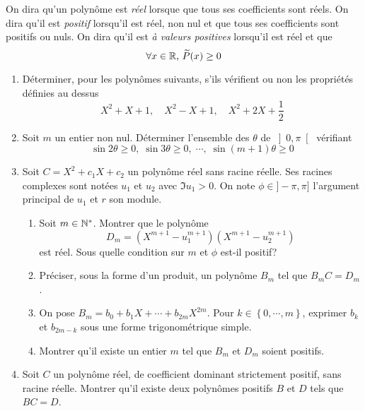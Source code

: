 On dira qu'un polyn{\^o}me est \emph{réel} lorsque que tous ses coefficients sont réels. On dira qu'il est \emph{positif} lorsqu'il est r{\'e}el, non nul et que tous ses coefficients sont positifs ou nuls. On dira qu'il est \emph{à valeurs positives} lorsqu'il est r{\'e}el et que
\begin{displaymath}
\forall x\in \mathbb{R}\text{, }\widetilde{P}(x)\geq 0
\end{displaymath}

\begin{enumerate}
\item  Déterminer, pour les polyn{\^o}mes suivants, s'ils vérifient ou non les propriétés définies au dessus
\begin{displaymath}
X^{2}+X+1,\quad X^{2}-X+1,\quad X^{2}+2X+\frac{1}{2}
\end{displaymath}

\item  Soit $m$ un entier non nul. D{\'e}terminer l'ensemble des $\theta $ de $\left] 0,\pi \right[$ vérifiant
\begin{displaymath}
\sin 2\theta \geq 0,\;\sin 3\theta \geq 0 ,\;\cdots, \; \sin (m+1)\theta \geq 0
\end{displaymath}

\item  Soit $C=X^{2}+c_{1}X+c_{2}$ un polyn{\^o}me r{\'e}el sans racine r{\'e}elle. Ses racines complexes sont notées $u_{1}$ et $u_{2}$ avec $\Im u_{1}>0$. On note $\phi \in ]-\pi , \pi]$ l'argument principal de $u_{1}$ et $r$ son module.

\begin{enumerate}
\item  Soit $m\in \mathbb{N}^*$. Montrer que le polyn{\^o}me
\begin{displaymath}
D_{m}=(X^{m+1}-u_{1}^{m+1})(X^{m+1}-u_{2}^{m+1})
\end{displaymath}
est r{\'e}el. Sous quelle condition sur $m$ et $\phi $ est-il positif?

\item  Préciser, sous la forme d'un produit, un polyn{\^o}me $B_{m}$ tel que $B_{m}C=D_{m}$.

\item  On pose $B_{m}=b_{0}+b_{1}X+\cdots +b_{2m}X^{2m}$. Pour $k\in\left\{ 0,\cdots ,m\right\}$, exprimer $b_{k}$ et $b_{2m-k}$ sous une forme trigonom{\'e}trique simple.

\item Montrer qu'il existe un entier $m$ tel que $B_m$ et $D_m$ soient positifs.
\end{enumerate}

\item  Soit $C$ un polyn{\^o}me r{\'e}el, de coefficient dominant strictement positif, sans racine r{\'e}elle. Montrer qu'il existe deux polyn{\^o}mes positifs $B$ et $D$ tels que $BC=D$.
\end{enumerate}
